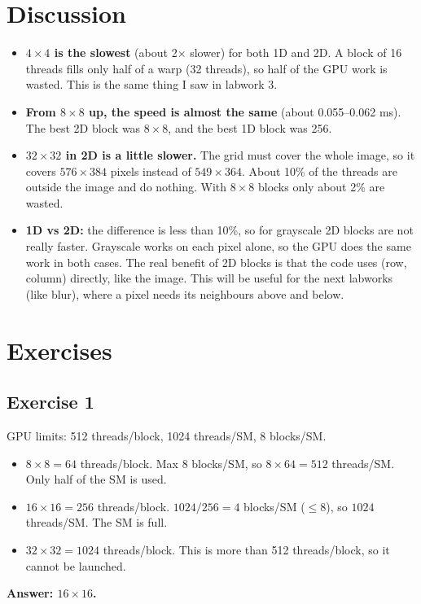 \documentclass[11pt,a4paper]{article}
\begin{document}
\section{Discussion}
\begin{itemize}
  \item \textbf{$4 \times 4$ is the slowest} (about 2$\times$ slower)
  for both 1D and 2D. A block of 16 threads fills only half of a warp
  (32 threads), so half of the GPU work is wasted. This is the same
  thing I saw in labwork 3.
  \item \textbf{From $8 \times 8$ up, the speed is almost the same}
  (about 0.055--0.062 ms). The best 2D block was $8 \times 8$, and the
  best 1D block was 256.
  \item \textbf{$32 \times 32$ in 2D is a little slower.} The grid must
  cover the whole image, so it covers $576 \times 384$ pixels instead
  of $549 \times 364$. About 10\% of the threads are outside the image
  and do nothing. With $8 \times 8$ blocks only about 2\% are wasted.
  \item \textbf{1D vs 2D:} the difference is less than 10\%, so for
  grayscale 2D blocks are not really faster. Grayscale works on each
  pixel alone, so the GPU does the same work in both cases. The real
  benefit of 2D blocks is that the code uses (row, column) directly,
  like the image. This will be useful for the next labworks (like
  blur), where a pixel needs its neighbours above and below.
\end{itemize}

\section{Exercises}

\subsection*{Exercise 1}
GPU limits: 512 threads/block, 1024 threads/SM, 8 blocks/SM.
\begin{itemize}
  \item $8 \times 8 = 64$ threads/block. Max 8 blocks/SM, so
  $8 \times 64 = 512$ threads/SM. Only half of the SM is used.
  \item $16 \times 16 = 256$ threads/block. $1024 / 256 = 4$ blocks/SM
  ($\le 8$), so $1024$ threads/SM. The SM is full.
  \item $32 \times 32 = 1024$ threads/block. This is more than 512
  threads/block, so it cannot be launched.
\end{itemize}
\textbf{Answer: $16 \times 16$.}
\end{document}

